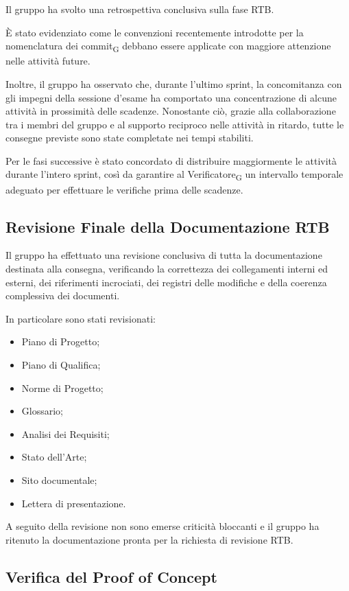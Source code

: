 Il gruppo ha svolto una retrospettiva conclusiva sulla fase RTB.

È stato evidenziato come le convenzioni recentemente introdotte per la nomenclatura dei commit\textsubscript{G} debbano essere applicate con maggiore attenzione nelle attività future.

Inoltre, il gruppo ha osservato che, durante l'ultimo sprint, la concomitanza con gli impegni della sessione d'esame ha comportato una concentrazione di alcune attività in prossimità delle scadenze. Nonostante ciò, grazie alla collaborazione tra i membri del gruppo e al supporto reciproco nelle attività in ritardo, tutte le consegne previste sono state completate nei tempi stabiliti.

Per le fasi successive è stato concordato di distribuire maggiormente le attività durante l'intero sprint, così da garantire al Verificatore\textsubscript{G} un intervallo temporale adeguato per effettuare le verifiche prima delle scadenze.

\subsection{Revisione Finale della Documentazione RTB}

Il gruppo ha effettuato una revisione conclusiva di tutta la documentazione destinata alla consegna, verificando la correttezza dei collegamenti interni ed esterni, dei riferimenti incrociati, dei registri delle modifiche e della coerenza complessiva dei documenti.

In particolare sono stati revisionati:

\begin{itemize}
\item Piano di Progetto;
\item Piano di Qualifica;
\item Norme di Progetto;
\item Glossario;
\item Analisi dei Requisiti;
\item Stato dell'Arte;
\item Sito documentale;
\item Lettera di presentazione.
\end{itemize}

A seguito della revisione non sono emerse criticità bloccanti e il gruppo ha ritenuto la documentazione pronta per la richiesta di revisione RTB.

\subsection{Verifica del Proof of Concept}

